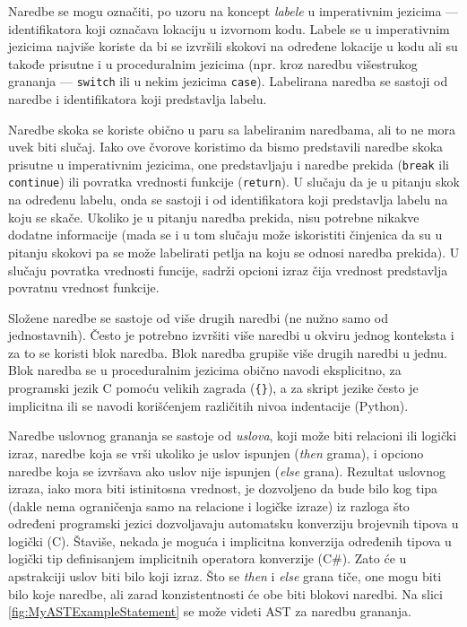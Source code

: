 Naredbe se mogu označiti, po uzoru na koncept \emph{labele} u imperativnim jezicima --- identifikatora koji označava lokaciju u izvornom kodu. Labele se u imperativnim jezicima najviše koriste da bi se izvršili skokovi na određene lokacije u kodu ali su takođe prisutne i u proceduralnim jezicima (npr. kroz naredbu višestrukog grananja --- \texttt{switch} ili u nekim jezicima \texttt{case}). Labelirana naredba se sastoji od naredbe i identifikatora koji predstavlja labelu. 

Naredbe skoka se koriste obično u paru sa labeliranim naredbama, ali to ne mora uvek biti slučaj. Iako ove čvorove koristimo da bismo predstavili naredbe skoka prisutne u imperativnim jezicima, one predstavljaju i naredbe prekida (\texttt{break} ili \texttt{continue}) ili povratka vrednosti funkcije (\texttt{return}). U slučaju da je u pitanju skok na određenu labelu, onda se sastoji i od identifikatora koji predstavlja labelu na koju se skače. Ukoliko je u pitanju naredba prekida, nisu potrebne nikakve dodatne informacije (mada se i u tom slučaju može iskoristiti činjenica da su u pitanju skokovi pa se može labelirati petlja na koju se odnosi naredba prekida). U slučaju povratka vrednosti funcije, sadrži opcioni izraz čija vrednost predstavlja povratnu vrednost funkcije.

Složene naredbe se sastoje od više drugih naredbi (ne nužno samo od jednostavnih). Često je potrebno izvršiti više naredbi u okviru jednog konteksta i za to se koristi blok naredba. Blok naredba grupiše više drugih naredbi u jednu. Blok naredba se u proceduralnim jezicima obično navodi eksplicitno, za programski jezik C pomoću velikih zagrada (\texttt{\{\}}), a za skript jezike često je implicitna ili se navodi korišćenjem različitih nivoa indentacije (Python).

Naredbe uslovnog grananja se sastoje od \emph{uslova}, koji može biti relacioni ili logički izraz, naredbe koja se vrši ukoliko je uslov ispunjen (\emph{then} grama), i opciono naredbe koja se izvršava ako uslov nije ispunjen (\emph{else} grana). Rezultat uslovnog izraza, iako mora biti istinitosna vrednost, je dozvoljeno da bude bilo kog tipa (dakle nema ograničenja samo na relacione i logičke izraze) iz razloga što određeni programski jezici dozvoljavaju automatsku konverziju brojevnih tipova u logički (C). Štaviše, nekada je moguća i implicitna konverzija određenih tipova u logički tip definisanjem implicitnih operatora konverzije (C\#). Zato će u apstrakciji uslov biti bilo koji izraz. Što se \emph{then} i \emph{else} grana tiče, one mogu biti bilo koje naredbe, ali zarad konzistentnosti će obe biti blokovi naredbi. Na slici \ref{fig:MyASTExampleStatement} se može videti AST za naredbu grananja.

